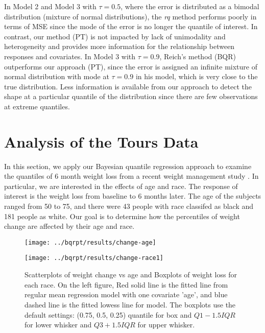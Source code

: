 \documentclass[12pt]{article}
\begin{document}
In Model 2 and Model 3 with $\tau=0.5$, where the error is distributed
as a bimodal distribution (mixture of normal distributions), the
\textit{rq} method performs poorly in terms of MSE since the mode of
the error is no longer the quantile of interest. In contrast, our
method (PT) is not impacted by lack of unimodality and heterogeneity
and provides more information for the relationship between responses
and covariates. In Model 3 with $\tau=0.9$, Reich's method (BQR)
outperforms our approach (PT), since the error is assigned an infinite
mixture of normal distribution with mode at $\tau=0.9$ in his model,
which is very close to the true distribution. Less information is
available from our approach to detect the shape at a particular
quantile of the distribution since there are few observations at
extreme quantiles.

\section{Analysis of the Tours Data}
\label{sec:tours}
In this section, we apply our Bayesian quantile regression approach to
examine the quantiles of 6 month weight loss from a recent weight
management study \citep{perri2008extended}.  In particular, we are
interested in the effects of age and race.  The response of interest
is the weight loss from baseline to 6 months later. The age of the
subjects ranged from 50 to 75, and there were 43 people with race
classifed as black and 181 people as white.  Our goal is to determine
how the percentiles of weight change are affected by their age and
race.

\begin{figure}[h]
  \begin{minipage}{0.5\linewidth}
    \centerline{\texttt{[image: ../bqrpt/results/change-age]}}
  \end{minipage}
  \begin{minipage}{0.5\linewidth}
    \centerline{\texttt{[image: ../bqrpt/results/change-race1]}}
  \end{minipage}

  \caption[]{\label{fig:tours} Scatterplots of weight change vs age
    and Boxplots of weight loss for each race. On the left figure, Red
    solid line is the fitted line from regular mean regression model
    with one covariate 'age', and blue dashed line is the fitted
    lowess line for model.  The boxplots use the default settings:
    (0.75, 0.5, 0.25) quantile for box and $Q1-1.5IQR$ for lower
    whisker and $Q3+1.5IQR$ for upper whisker. }
\end{figure}
\end{document}
